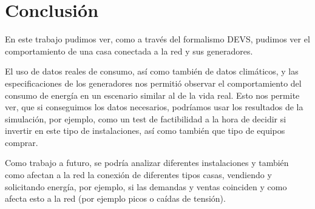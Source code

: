 \section{Conclusión}
En este trabajo pudimos ver, como a través del formalismo DEVS, pudimos ver el comportamiento de una
casa conectada a la red y sus generadores.

El uso de datos reales de consumo, así como también de datos climáticos, y las especificaciones de los
generadores nos permitió observar el comportamiento del consumo de energía en un escenario similar al
de la vida real. Esto nos permite ver, que si conseguimos los datos necesarios, podríamos usar los 
resultados de la simulación, por ejemplo, como un test de factibilidad a la hora de decidir si invertir
en este tipo de instalaciones, así como también que tipo de equipos comprar.

Como trabajo a futuro, se podría analizar diferentes instalaciones y también como afectan a la red 
la conexión de diferentes tipos casas, vendiendo y solicitando energía, por ejemplo, si las demandas y 
ventas coinciden y como afecta esto a la red (por ejemplo picos o caídas de tensión).